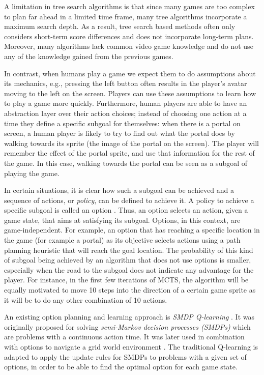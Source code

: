 A limitation in tree search algorithms is that since many games are too complex
to plan far ahead in a limited time frame, many tree algorithms incorporate a
maximum search depth. As a result, tree search based methods often only
considers short-term score differences and does not incorporate long-term
plans. Moreover, many algorithms lack common video game knowledge and do not
use any of the knowledge gained from the previous games.

In contrast, when humans play a game we expect them to do assumptions about its
mechanics, e.g., pressing the left button often results in the player's avatar
moving to the left on the screen. Players can use these assumptions to learn how
to play a game more quickly. Furthermore, human players are able to have an
abstraction layer over their action choices; instead of choosing one action at a
time they define a specific subgoal for themselves: when there is a portal on
screen, a human player is likely to try to find out what the portal does by
walking towards its sprite (the image of the portal on the screen). The player
will remember the effect of the portal sprite, and use that information for the
rest of the game. In this case, walking towards the portal can be seen as a
subgoal of playing the game.

In certain situations, it is clear how such a subgoal can be achieved and a
sequence of actions, or \emph{policy}, can be defined to achieve it. A policy to
achieve a specific subgoal is called an option \cite{sutton1999between}. Thus, an option selects an
action, given a game state, that aims at satisfying its subgoal. Options, in
this context, are game-independent. For example, an option that has reaching a
specific location in the game (for example a portal) as its objective selects
actions using a path planning heuristic that will reach the goal location. 
The probability of this kind of subgoal being achieved by an algorithm that
does not use options is smaller, especially when the road to the subgoal does
not indicate any advantage for the player. For instance, in the first few
iterations of MCTS, the algorithm will be equally motivated to move 10 steps
into the direction of a certain game sprite as it will be to do any other
combination of 10 actions. 

An existing option planning and learning approach is \emph{SMDP Q-learning}
\cite{duff1995reinforcement}. It was originally proposed for solving
\emph{semi-Markov decision processes (SMDPs)} which are problems with a
continuous action time. It was later used in combination with options to
navigate a grid world environment \cite{sutton1999between, stolle2002learning}.
The traditional Q-learning is adapted to apply the update rules for SMDPs to
problems with a given set of options, in order to be able to find the optimal
option for each game state. 

